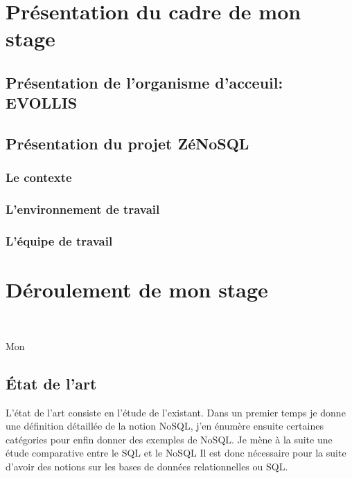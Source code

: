 




\begin{abstract}
  
\end{abstract}

\tableofcontents





\part{Présentation du cadre de mon stage}

\chapter{Présentation de l'organisme d'acceuil: {\sf EVOLLIS}}
\chapter{Présentation du projet \textsf{ZéNoSQL}}
\section{Le contexte}

\section{L'environnement de travail}
\section{L'équipe de travail}

\part{Déroulement de mon stage}

\newpage
~
\vspace{7cm}
\begin{center}
  \textsf{Mon} 
\end{center}
\newpage

\chapter{État de l'art}
{\color{blue} L'état de l'art consiste en l'étude de l'existant. Dans un premier temps je donne une définition détaillée de la notion \textsf{NoSQL}, j'en énumère ensuite certaines catégories pour enfin donner des exemples de \textsf{NoSQL}. Je mène à la suite une étude comparative entre le \textsf{SQL} et le \textsf{NoSQL} Il est donc nécessaire pour la suite d'avoir des notions sur les bases de données relationnelles ou \textsf{SQL}. }

